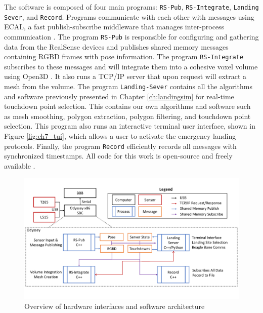 The software is composed of four main programs: \texttt{RS-Pub}, \texttt{RS-Integrate}, \texttt{Landing Sever}, and \texttt{Record}. Programs communicate with each other with messages using \ac{ECAL}, a fast publish-subscribe middleware that manages inter-process communication \cite{Continental_Github_ecal}. The program \texttt{RS-Pub} is responsible for configuring and gathering data from the RealSense devices and publishes shared memory messages containing \ac{RGBD} frames with pose information. The program \texttt{RS-Integrate} subscribes to these messages and will integrate them into a cohesive voxel volume using Open3D \cite{zhou_open3d_2018}. It also runs a TCP/IP server that upon request will extract a mesh from the volume. The program \texttt{Landing-Sever} contains all the algorithms and software previously presented in Chapter \ref{ch:landingsim} for real-time touchdown point selection. This contains our own algorithms and software such as mesh smoothing, polygon extraction, polygon filtering, and touchdown point selection. This program also runs an interactive terminal user interface, shown in Figure \ref{fig:ch7_tui}, which allows a user to activate the emergency landing protocols. Finally, the program \texttt{Record} efficiently records all messages with synchronized timestamps. All code for this work is open-source and freely available \cite{Castagno_Github_realsensepackage}.

\begin{figure}[!tb]
    \centering  
    \includegraphics[page=1,clip,trim=0cm 0cm 0cm 0cm,width=.95\linewidth]{chapter_7_experiments/imgs/SoftwareOverview.pdf}
    \caption[Overview of hardware interfaces and software architecture]{Overview of hardware interfaces and software architecture}\label{fig:ch7_software}
\end{figure}


